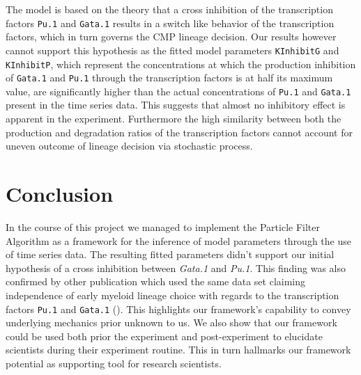 \documentclass{bioinfo}
\begin{document}
The model is based on the theory that a cross inhibition of the transcription factors \texttt{Pu.1} and \texttt{Gata.1} results in a switch like behavior of the transcription factors, which in turn governs the CMP lineage decision. Our results however cannot support this hypothesis as the fitted model parameters \texttt{KInhibitG} and \texttt{KInhibitP}, which represent the concentrations at which the production inhibition of \texttt{Gata.1} and \texttt{Pu.1} through the transcription factors is at half its maximum value, are significantly higher than the actual concentrations of \texttt{Pu.1} and \texttt{Gata.1} present in the time series data. This suggests that almost no inhibitory effect is apparent in the experiment. Furthermore the high similarity between both the production and degradation ratios of the transcription factors cannot account for uneven outcome of lineage decision via stochastic process.

\vspace*{-6pt}

\section{Conclusion}

In the course of this project we managed to implement the Particle Filter Algorithm as a framework for the inference of model parameters through the use of time series data. The resulting fitted parameters didn't support our initial hypothesis of a cross inhibition between \textit{Gata.1} and \textit{Pu.1}. This finding was also confirmed by other publication which used the same data set claiming independence of early myeloid lineage choice with regards to the transcription factors \texttt{Pu.1} and \texttt{Gata.1} (\citealp{Hoppe16}). This highlights our framework's capability to convey underlying mechanics prior unknown to us. We also show that our framework could be used both prior the experiment and post-experiment to elucidate scientists during their experiment routine. This in turn hallmarks our framework potential as supporting tool for research scientists.

\vspace*{-6pt}

\end{document}
